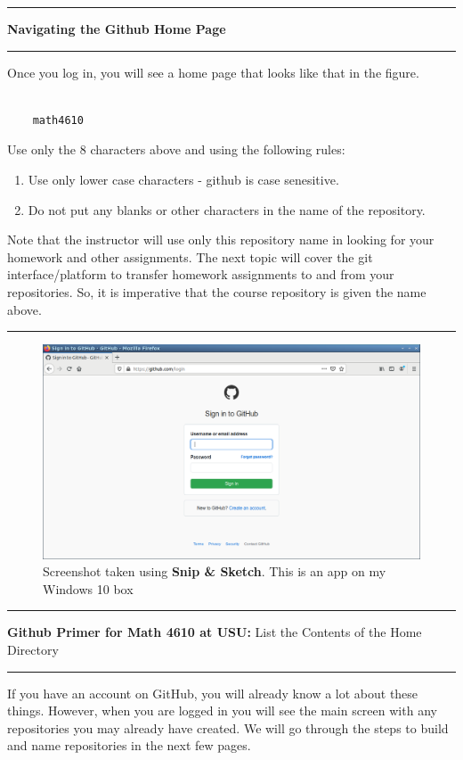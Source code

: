 \documentclass[10pt,fleqn]{article}
\begin{document}
\vskip0.1in\hrule\vskip0.1in\noindent
{\bf Navigating the Github Home Page} 
\vskip0.1in\hrule\vskip0.1in\noindent
Once you log in, you will see a home page that looks like that in the figure.
\begin{verbatim}

    math4610

\end{verbatim}
Use only the 8 characters above and using the following rules:
\begin{enumerate}
  \item Use only lower case characters - github is case senesitive.
  \item Do not put any blanks or other characters in the name of the repository.
\end{enumerate}
Note that the instructor will use only this repository name in looking for your
homework and other assignments. The next topic will cover the git
interface/platform to transfer homework assignments to and from your
repositories. So, it is imperative that the course repository is given the name
above.
\vskip0.1in\hrule\vskip0.1in
\vfill
\begin{figure}[h]
\centering
\includegraphics[width=5.0in]{../images/github_02.png}
\caption{{Screenshot} taken using {\bf Snip \& Sketch}. This is an app on
         my Windows 10 box}
\end{figure}
\eject
\vskip0.1in\hrule\vskip0.1in
\noindent
{{\bf Github Primer for Math 4610 at USU:} List the Contents of the Home
    Directory} 
\vskip0.1in\hrule\vskip0.1in
\noindent
If you have an account on GitHub, you will already know a lot about these
things. However, when you are logged in you will see the main screen with any
repositories you may already have created. We will go through the steps to
build and name repositories in the next few pages.
\end{document}
